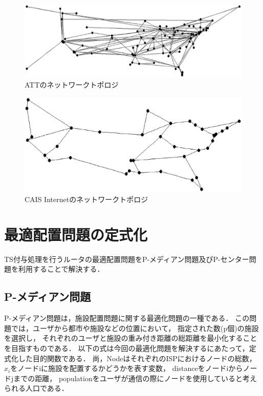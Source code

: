 \documentclass[a4j,11pt]{jreport}
\begin{document}
\begin{figure}[htbp]
  \centering
  \includegraphics[scale=0.415]{data/ATT.eps}
  \vspace{0mm}
  \caption{ATTのネットワークトポロジ}
  \label{fig:ATT}
\end{figure}

\begin{figure}[htbp]
  \centering
  \includegraphics[scale=0.585]{data/CAIS_Internet.eps}
  \vspace{0mm}
  \caption{CAIS Internetのネットワークトポロジ}
  \label{fig:CAIS}
\end{figure}

\section{最適配置問題の定式化}
TS付与処理を行うルータの最適配置問題をP-メディアン問題及びP-センター問題を利用することで解決する．


\subsection{P-メディアン問題}
P-メディアン問題は，施設配置問題に関する最適化問題の一種である．
この問題では，ユーザから都市や施設などの位置において，
指定された数(p個)の施設を選択し，
それぞれのユーザと施設の重み付き距離の総距離を最小化することを目指すものである．
以下の式は今回の最適化問題を解決するにあたって，定式化した目的関数である．
尚，NodeはそれぞれのISPにおけるノードの総数，
$x_{i}$をノードiに施設を配置するかどうかを表す変数，
distanceをノードiからノードjまでの距離，
populationをユーザが通信の際にノードを使用していると考えられる人口である．
\end{document}
